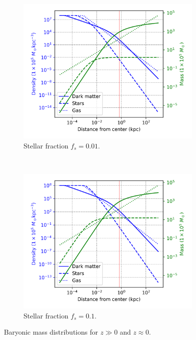 			\begin{figure}[h]
				\centering
				\begin{subfigure}[b]{0.49\textwidth}
					\includegraphics[width=\textwidth]{"../Files/Week 6/density_mass_fs01"}
					\caption{Stellar fraction $f_s = 0.01$.}
					\label{fig: baryonicprofilehigh}
				\end{subfigure}
				~ 
				\begin{subfigure}[b]{0.49\textwidth}
					\includegraphics[width=\textwidth]{"../Files/Week 6/density_mass_fs1"}
					\caption{Stellar fraction $f_s = 0.1$.}
					\label{fig: baryonicprofilelow}
				\end{subfigure}
				\caption{Baryonic mass distributions for $z \gg 0$ and $z \approx 0$.}
				\label{fig: baryonicprofile}
			\end{figure}
	
